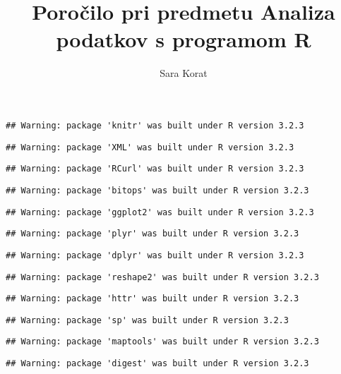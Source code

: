 \documentclass[]{article}
\title{Poročilo pri predmetu Analiza podatkov s programom R}
\author{Sara Korat}
\date{}
\begin{document}
\maketitle


\begin{verbatim}
## Warning: package 'knitr' was built under R version 3.2.3
\end{verbatim}

\begin{verbatim}
## Warning: package 'XML' was built under R version 3.2.3
\end{verbatim}

\begin{verbatim}
## Warning: package 'RCurl' was built under R version 3.2.3
\end{verbatim}

\begin{verbatim}
## Warning: package 'bitops' was built under R version 3.2.3
\end{verbatim}

\begin{verbatim}
## Warning: package 'ggplot2' was built under R version 3.2.3
\end{verbatim}

\begin{verbatim}
## Warning: package 'plyr' was built under R version 3.2.3
\end{verbatim}

\begin{verbatim}
## Warning: package 'dplyr' was built under R version 3.2.3
\end{verbatim}

\begin{verbatim}
## Warning: package 'reshape2' was built under R version 3.2.3
\end{verbatim}

\begin{verbatim}
## Warning: package 'httr' was built under R version 3.2.3
\end{verbatim}

\begin{verbatim}
## Warning: package 'sp' was built under R version 3.2.3
\end{verbatim}

\begin{verbatim}
## Warning: package 'maptools' was built under R version 3.2.3
\end{verbatim}

\begin{verbatim}
## Warning: package 'digest' was built under R version 3.2.3
\end{verbatim}
\end{document}
